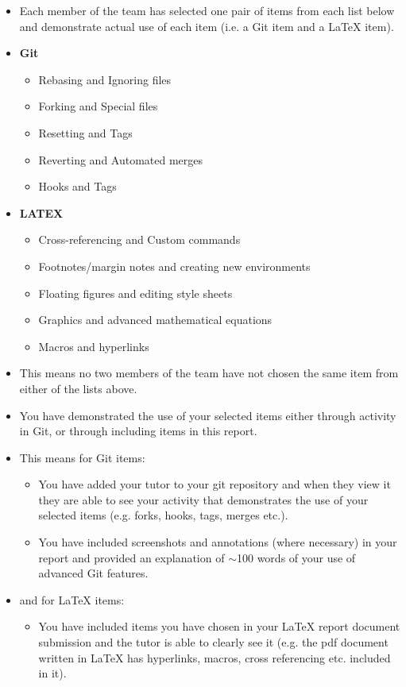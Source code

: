 \documentclass[a4paper, 11pt]{report}
\begin{document}
{\begin{itemize}
\begin{itemize}
	\item Each member of the team has selected one pair of items from each list below and demonstrate actual use of each item (i.e. a Git item and a LaTeX item).
	\item \textbf{Git}
		\begin{itemize}
		\item Rebasing and Ignoring files
		\item Forking and Special files
		\item Resetting and Tags
		\item Reverting and Automated merges
		\item Hooks and Tags
		\end{itemize}
	\item \textbf{LATEX}
		\begin{itemize}
		\item Cross-referencing and Custom commands
		\item Footnotes/margin notes and creating new environments
		\item Floating figures and editing style sheets
		\item Graphics and advanced mathematical equations
		\item Macros and hyperlinks
		\end{itemize}
	\item This means no two members of the team have not chosen the same item from either of the lists above.
	\item You have demonstrated the use of your selected items either through activity in Git, or through including items in this report.
	\item This means for Git items:
		\begin{itemize}
		\item You have added your tutor to your git repository and when they view it they are able to see your activity that demonstrates the use of your selected items (e.g. forks, hooks, tags, merges etc.).
		\item You have included screenshots and annotations (where necessary) in your report and provided an explanation of $\sim$100 words of your use of advanced Git features.
		\end{itemize}
	\item and for LaTeX items:
		\begin{itemize}
		\item You have included items you have chosen in your LaTeX report document submission and the tutor is able to clearly see it (e.g. the pdf document written in LaTeX has hyperlinks, macros, cross referencing etc. included in it).

\end{itemize}
\end{itemize}
\end{itemize}}
\end{document}
